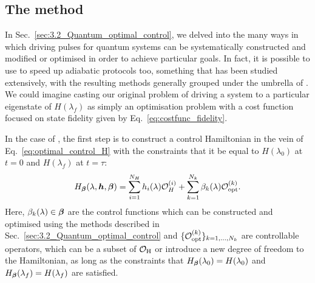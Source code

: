 \subsection{The method}

In Sec.~\ref{sec:3.2_Quantum_optimal_control}, we delved into the many ways in which driving pulses for quantum systems can be systematically constructed and modified or optimised in order to achieve particular goals. In fact, it is possible to use  to speed up adiabatic protocols too, something that has been studied extensively, with the resulting methods generally grouped under the umbrella of  \cite{guery-odelin_shortcuts_2019, torrontegui_chapter_2013}. We could imagine casting our original problem of driving a system to a particular eigenstate of $H(\lambda_f)$ as simply an optimisation problem with a cost function focused on state fidelity given by Eq.~\eqref{eq:costfunc_fidelity}. 

In the case of , the first step is to construct a control Hamiltonian in the vein of Eq.~\eqref{eq:optimal_control_H} with the constraints that it be equal to $H(\lambda_0)$ at $t=0$ and $H(\lambda_f)$ at $t=\tau$:
\begin{equation}\label{eq:COLD_optimal_control}
    H_{\boldsymbol{\beta}}(\lambda, \boldsymbol{h}, \boldsymbol{\beta}) = \sum_{i = 1}^{N_H} h_i(\lambda) \mathcal{O}_H^{(i)} + \sum_{k = 1}^{N_k} \beta_k(\lambda) \mathcal{O}_{\rm opt}^{(k)}.
\end{equation}
Here, $\beta_k(\lambda) \in \boldsymbol{\beta}$ are the control functions which can be constructed and optimised using the methods described in Sec.~\ref{sec:3.2_Quantum_optimal_control} and $\{\mathcal{O}_{\rm opt}^{(k)}\}_{k = 1, ..., N_k}$ are controllable operators, which can be a subset of $\mathcal{O}_{\rm H}$ or introduce a new degree of freedom to the Hamiltonian, as long as the constraints that $H_{\boldsymbol{\beta}}(\lambda_0) = H(\lambda_0)$ and $H_{\boldsymbol{\beta}}(\lambda_f) = H(\lambda_f)$ are satisfied. 

